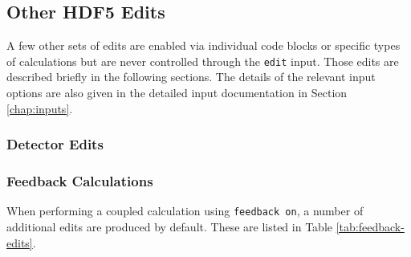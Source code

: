 \FloatBarrier

\subsection{Other HDF5 Edits}\label{sec:other-hdf5-edits}

A few other sets of edits are enabled via individual code blocks or specific types of calculations but are never controlled through the \texttt{edit} input.  Those edits are described briefly in the following sections.  The details of the relevant input options are also given in the detailed input documentation in Section \ref{chap:inputs}.
\subsubsection{Detector Edits}\label{sec:detector-edits}
\subsubsection{Feedback Calculations}\label{sec:feedback-edits}

When performing a coupled calculation using \texttt{feedback on}, a number of additional edits are produced by default.  These are listed in Table \ref{tab:feedback-edits}.

